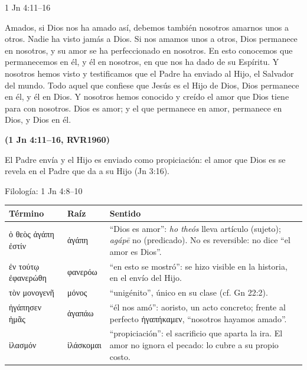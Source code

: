 \documentclass[hyperref={bookmarks=false},aspectratio=169]{beamer}
\newcommand{\grc}[1]{\foreignlanguage{ancientgreek}{#1}}
\newcommand{\fuente}[1]{\par\hfill{\upshape\bfseries\footnotesize\textcolor{azul}{#1}}}
\begin{document}
\begin{frame}{1 Jn 4:11--16}
\begin{cita}Amados, si Dios nos ha amado así, debemos también nosotros amarnos unos a otros. Nadie ha visto jamás a Dios. Si nos amamos unos a otros, Dios permanece en nosotros, y su amor se ha perfeccionado en nosotros. En esto conocemos que permanecemos en él, y él en nosotros, en que nos ha dado de su Espíritu. Y nosotros hemos visto y testificamos que el Padre ha enviado al Hijo, el Salvador del mundo. Todo aquel que confiese que Jesús es el Hijo de Dios, Dios permanece en él, y él en Dios. Y nosotros hemos conocido y creído el amor que Dios tiene para con nosotros. Dios es amor; y el que permanece en amor, permanece en Dios, y Dios en él.\fuente{(1 Jn 4:11--16, RVR1960)}\end{cita}
\scriptsize El Padre envía y el Hijo es enviado como propiciación: el amor que Dios es se revela en el Padre que da a su Hijo (Jn 3:16).
\end{frame}

\begin{frame}{Filología: 1 Jn 4:8--10}
\renewcommand{\arraystretch}{1.15}\scriptsize
\begin{tabular}{@{}>{\RaggedRight\arraybackslash}p{3.0cm}>{\RaggedRight\arraybackslash}p{1.4cm}>{\RaggedRight\arraybackslash}p{7.6cm}@{}}
\toprule
\textbf{Término} & \textbf{Raíz} & \textbf{Sentido} \\ \midrule
\grc{ὁ θεὸς ἀγάπη ἐστίν} & \grc{ἀγάπη} & ``Dios es amor'': \emph{ho theós} lleva artículo (sujeto); \emph{agápē} no (predicado). No es reversible: no dice ``el amor es Dios''. \\
\grc{ἐν τούτῳ ἐφανερώθη} & \grc{φανερόω} & ``en esto se mostró'': se hizo visible en la historia, en el envío del Hijo. \\
\grc{τὸν μονογενῆ} & \grc{μόνος} & ``unigénito'', único en su clase (cf. Gn 22:2). \\
\grc{ἠγάπησεν ἡμᾶς} & \grc{ἀγαπάω} & ``él nos amó'': aoristo, un acto concreto; frente al perfecto \grc{ἠγαπήκαμεν}, ``nosotros hayamos amado''. \\
\grc{ἱλασμόν} & \grc{ἱλάσκομαι} & ``propiciación'': el sacrificio que aparta la ira. El amor no ignora el pecado: lo cubre a su propio costo. \\
\bottomrule
\end{tabular}
\end{frame}
\end{document}
